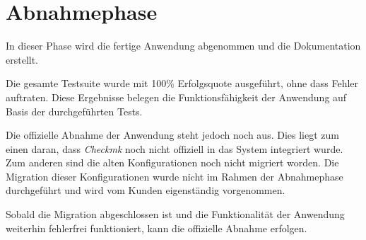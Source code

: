 \section{Abnahmephase}
In dieser Phase wird die fertige Anwendung abgenommen und die Dokumentation erstellt.

\noindent
Die gesamte Testsuite wurde mit 100\% Erfolgsquote ausgeführt, ohne dass Fehler auftraten.
Diese Ergebnisse belegen die Funktionsfähigkeit der Anwendung auf Basis der durchgeführten Tests.

\noindent
Die offizielle Abnahme der Anwendung steht jedoch noch aus.
Dies liegt zum einen daran, dass \textit{Checkmk} noch nicht offiziell in das System integriert wurde.
Zum anderen sind die alten Konfigurationen noch nicht migriert worden.
Die Migration dieser Konfigurationen wurde nicht im Rahmen der Abnahmephase durchgeführt und wird vom Kunden eigenständig vorgenommen.

\noindent
Sobald die Migration abgeschlossen ist und die Funktionalität der Anwendung weiterhin fehlerfrei funktioniert, kann die offizielle Abnahme erfolgen.
